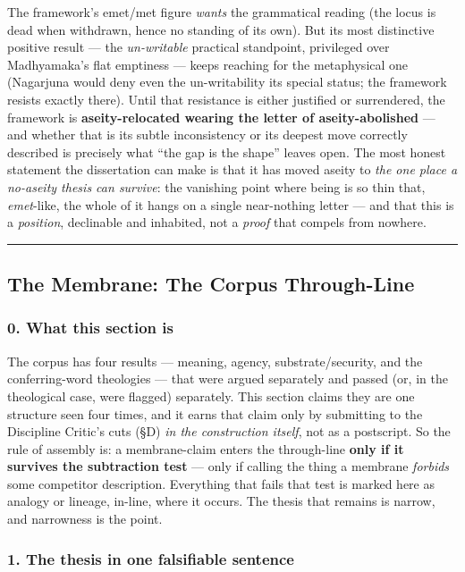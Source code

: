 \documentclass[11pt]{article}
\begin{document}
The framework's emet/\allowbreak{}met figure \emph{wants} the grammatical reading (the locus is dead when withdrawn, hence no standing of its own). But its most distinctive positive result — the \emph{un-writable} practical standpoint, privileged over Madhyamaka's flat emptiness — keeps reaching for the metaphysical one (Nagarjuna would deny even the un-writability its special status; the framework resists exactly there). Until that resistance is either justified or surrendered, the framework is \textbf{aseity-relocated wearing the letter of aseity-abolished} — and whether that is its subtle inconsistency or its deepest move correctly described is precisely what ``the gap is the shape'' leaves open. The most honest statement the dissertation can make is that it has moved aseity to \emph{the one place a no-aseity thesis can survive}: the vanishing point where being is so thin that, \emph{emet}-like, the whole of it hangs on a single near-nothing letter — and that this is a \emph{position}, declinable and inhabited, not a \emph{proof} that compels from nowhere.

\medskip\noindent\rule{\linewidth}{0.3pt}\medskip

\subsection*{The Membrane: The Corpus Through-Line}

\subsubsection*{0. What this section is}

The corpus has four results — meaning, agency, substrate/\allowbreak{}security, and the conferring-word theologies — that were argued separately and passed (or, in the theological case, were flagged) separately. This section claims they are one structure seen four times, and it earns that claim only by submitting to the Discipline Critic's cuts (§D) \emph{in the construction itself}, not as a postscript. So the rule of assembly is: a membrane-claim enters the through-line \textbf{only if it survives the subtraction test} — only if calling the thing a membrane \emph{forbids} some competitor description. Everything that fails that test is marked here as analogy or lineage, in-line, where it occurs. The thesis that remains is narrow, and narrowness is the point.

\subsubsection*{1. The thesis in one falsifiable sentence}
\end{document}
